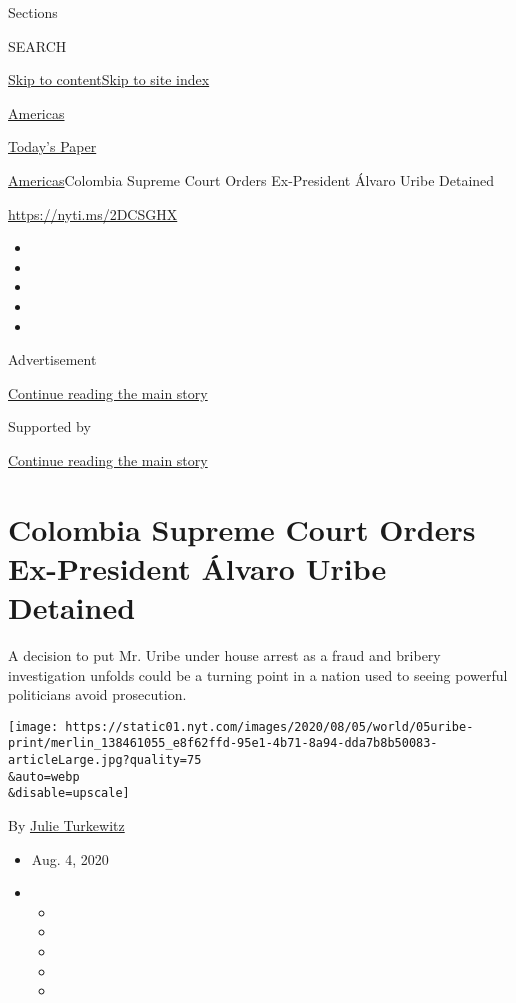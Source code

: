Sections

SEARCH

\protect\hyperlink{site-content}{Skip to
content}\protect\hyperlink{site-index}{Skip to site index}

\href{https://www.nytimes.com/section/world/americas}{Americas}

\href{https://myaccount.nytimes.com/auth/login?response_type=cookie\&client_id=vi}{}

\href{https://www.nytimes.com/section/todayspaper}{Today's Paper}

\href{/section/world/americas}{Americas}\textbar{}Colombia Supreme Court
Orders Ex-President Álvaro Uribe Detained

\url{https://nyti.ms/2DCSGHX}

\begin{itemize}
\item
\item
\item
\item
\item
\end{itemize}

Advertisement

\protect\hyperlink{after-top}{Continue reading the main story}

Supported by

\protect\hyperlink{after-sponsor}{Continue reading the main story}

\hypertarget{colombia-supreme-court-orders-ex-president-uxe1lvaro-uribe-detained}{%
\section{Colombia Supreme Court Orders Ex-President Álvaro Uribe
Detained}\label{colombia-supreme-court-orders-ex-president-uxe1lvaro-uribe-detained}}

A decision to put Mr. Uribe under house arrest as a fraud and bribery
investigation unfolds could be a turning point in a nation used to
seeing powerful politicians avoid prosecution.

\texttt{[image: https://static01.nyt.com/images/2020/08/05/world/05uribe-print/merlin\_138461055\_e8f62ffd-95e1-4b71-8a94-dda7b8b50083-articleLarge.jpg?quality=75\\\&auto=webp\\\&disable=upscale]}

By \href{https://www.nytimes.com/by/julie-turkewitz}{Julie Turkewitz}

\begin{itemize}
\item
  Aug. 4, 2020
\item
  \begin{itemize}
  \item
  \item
  \item
  \item
  \item
  \end{itemize}
\end{itemize}

